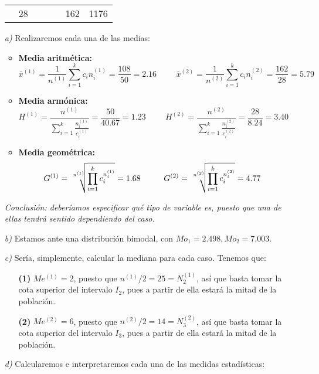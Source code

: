 \documentclass[11pt,a4paper]{article}
\theoremstyle{definition}
\begin{document}
\begin{itemize}
\begin{table}[!htbp]
{\begin{tabular}{|c|c|c|c|c|c|c|}
\multicolumn{1}{c}{} & \multicolumn{1}{|c|}{28} & \multicolumn{1}{c}{} & \multicolumn{1}{c}{} & \multicolumn{1}{c}{} & \multicolumn{1}{|c|}{162} & \multicolumn{1}{c|}{1176} \\ \cline{2-2} \cline{6-7}
\end{tabular}}
\end{table}
	\item[\emph{a)}] Realizaremos cada una de las medias:
	\begin{itemize}
		\item \textbf{Media aritmética:}
			$$ \bar{x}^{(1)} = \frac{1}{n^{(1)}}\sum_{i=1}^{k}c_in_i^{(1)}  = \frac{108}{50} = 2.16 \hspace{1cm} \bar{x}^{(2)} = \frac{1}{n^{(2)}}\sum_{i=1}^{k}c_in_i^{(2)}  = \frac{162}{28} = 5.79 $$
		\item \textbf{Media armónica:}
			$$ H^{(1)} = \frac{n^{(1)}}{\sum_{i=1}^{k}\frac{n_i^{(1)}}{c_i^{(1)}}}  = \frac{50}{40.67} = 1.23 \hspace{1cm} H^{(2)} = \frac{n^{(2)}}{\sum_{i=1}^{k}\frac{n_i^{(2)}}{c_i^{(2)}}}  = \frac{28}{8.24} = 3.40 $$
		\item \textbf{Media geométrica:}
			$$ G^{(1)} = \sqrt[\leftroot{-2}\uproot{2}n^{(1)}]{\prod_{i=1}^{k}c_i^{n_i^{(1)}}} = 1.68 \hspace{1cm} G^{(2)} = \sqrt[\leftroot{-2}\uproot{2}n^{(2)}]{\prod_{i=1}^{k}c_i^{n_i^{(2)}}} = 4.77 $$
	\end{itemize}
	\emph{Conclusión: deberíamos especificar qué tipo de variable es, puesto que una de ellas tendrá sentido dependiendo del caso.}
\pagebreak
	\item[\emph{b)}] Estamos ante una distribución bimodal, con $Mo_1 = 2.498, Mo_2=7.003 $.
	\item[\emph{c)}] Sería, simplemente, calcular la mediana para cada caso. Tenemos que:
	\begin{itemize}
		\item[\textbf{(1)}] $Me^{(1)} = 2$, puesto que $n^{(1)}/2 = 25 = N_2^{(1)}$, así que basta tomar la cota superior del intervalo $I_2$, pues a partir de ella estará la mitad de la población.
		\item[\textbf{(2)}] $Me^{(2)} = 6$, puesto que $n^{(2)}/2 = 14 = N_3^{(2)}$, así que basta tomar la cota superior del intervalo $I_3$, pues a partir de ella estará la mitad de la población.
	\end{itemize}
	\item[\emph{d)}] Calcularemos e interpretaremos cada una de las medidas estadísticas:
	\begin{itemize}

\end{itemize}
\end{itemize}
\end{document}
